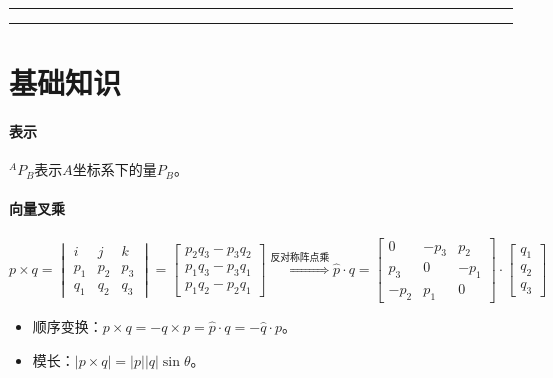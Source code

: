 \documentclass[
12pt, %
a4paper, 
oneside, %
headinclude,footinclude, %
]{scrartcl}
\title{\normalfont\spacedallcaps{机器人学导论}}
\date{}
\begin{document}
\maketitle
\newpage
\hypertarget{toc}{}
\begingroup
\begin{multicols}{2}
\tableofcontents
\end{multicols}
\endgroup
\hrule
\begingroup
\begin{multicols}{2}
\listoffigures
\end{multicols}
\endgroup
\hrule
\begingroup
\begin{multicols}{2}
\listoftables
\end{multicols}
\endgroup
\newpage
\listoftips
\newpage
\section{基础知识}
\paragraph{表示}
$ {}^A P_B $表示$ A $坐标系下的量$ P_B $。
\paragraph{向量叉乘}
$$
p \times q = \begin{vmatrix} i & j & k \\ p_1 & p_2 & p_3 \\ q_1 & q_2 & q_3 \end{vmatrix} = \begin{bmatrix} p_2 q_3 - p_3 q_2 \\ p_1 q_3 - p_3 q_1 \\ p_1 q_2 - p_2 q_1 \end{bmatrix}
\overset{\text{反对称阵点乘}}{\Longrightarrow}
\hat{p} \cdot q = \begin{bmatrix} 0 & -p_3 & p_2 \\ p_3 & 0 & -p_1 \\ -p_2 & p_1 & 0 \end{bmatrix} \cdot \begin{bmatrix} q_1 \\ q_2 \\ q_3 \end{bmatrix}
$$

\begin{itemize}
\item 顺序变换：$ p \times q = -q \times p = \hat{p} \cdot q = -\hat{q} \cdot p $。
\item 模长：$ |p \times q| = |p||q|\sin\theta $。
\end{itemize}
\end{document}
